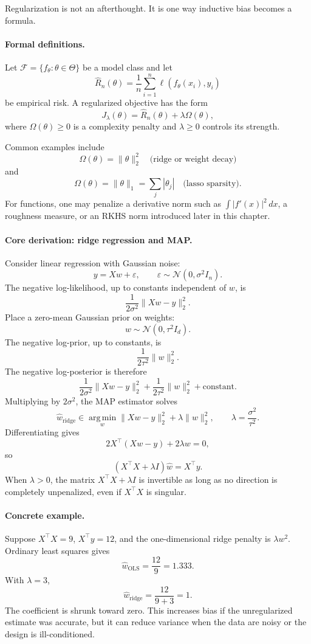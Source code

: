 Regularization is not an afterthought. It is one way inductive bias becomes a formula.

\paragraph{Formal definitions.}
Let \(\mathcal F=\{f_\theta:\theta\in\Theta\}\) be a model class and let
\[
\widehat R_n(\theta)=\frac1n\sum_{i=1}^n \ell(f_\theta(x_i),y_i)
\]
be empirical risk. A regularized objective has the form
\[
\boxed{
J_\lambda(\theta)=\widehat R_n(\theta)+\lambda\Omega(\theta),
}
\]
where \(\Omega(\theta)\geq0\) is a complexity penalty and \(\lambda\geq0\) controls its strength.

Common examples include
\[
\Omega(\theta)=\|\theta\|_2^2 \quad\text{(ridge or weight decay)}
\]
and
\[
\Omega(\theta)=\|\theta\|_1=\sum_j|\theta_j| \quad\text{(lasso sparsity)}.
\]
For functions, one may penalize a derivative norm such as \(\int |f'(x)|^2\,dx\), a roughness measure, or an RKHS norm introduced later in this chapter.

\paragraph{Core derivation: ridge regression and MAP.}
Consider linear regression with Gaussian noise:
\[
y=Xw+\varepsilon,\qquad \varepsilon\sim\mathcal N(0,\sigma^2 I_n).
\]
The negative log-likelihood, up to constants independent of \(w\), is
\[
\frac{1}{2\sigma^2}\|Xw-y\|_2^2.
\]
Place a zero-mean Gaussian prior on weights:
\[
w\sim\mathcal N(0,\tau^2 I_d).
\]
The negative log-prior, up to constants, is
\[
\frac{1}{2\tau^2}\|w\|_2^2.
\]
The negative log-posterior is therefore
\[
\frac{1}{2\sigma^2}\|Xw-y\|_2^2
+\frac{1}{2\tau^2}\|w\|_2^2
+\text{constant}.
\]
Multiplying by \(2\sigma^2\), the MAP estimator solves
\[
\boxed{
\widehat w_{\mathrm{ridge}}
\in\operatorname*{arg\,min}_w
\|Xw-y\|_2^2+\lambda\|w\|_2^2,
\qquad
\lambda=\frac{\sigma^2}{\tau^2}.
}
\]
Differentiating gives
\[
2X^\top(Xw-y)+2\lambda w=0,
\]
so
\[
\boxed{
(X^\top X+\lambda I)\widehat w=X^\top y.
}
\]
When \(\lambda>0\), the matrix \(X^\top X+\lambda I\) is invertible as long as no direction is completely unpenalized, even if \(X^\top X\) is singular.

\paragraph{Concrete example.}
Suppose \(X^\top X=9\), \(X^\top y=12\), and the one-dimensional ridge penalty is \(\lambda w^2\). Ordinary least squares gives
\[
\widehat w_{\mathrm{OLS}}=\frac{12}{9}=1.333.
\]
With \(\lambda=3\),
\[
\widehat w_{\mathrm{ridge}}=\frac{12}{9+3}=1.
\]
The coefficient is shrunk toward zero. This increases bias if the unregularized estimate was accurate, but it can reduce variance when the data are noisy or the design is ill-conditioned.

